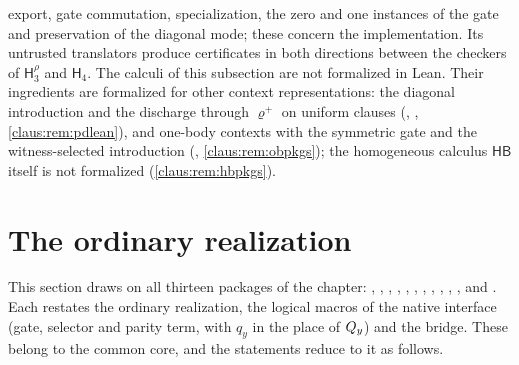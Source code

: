 \begin{remark}
export, gate commutation, specialization, the zero and one instances of
the gate and preservation of the diagonal mode; these concern the
implementation. Its untrusted translators produce certificates in both
directions between the checkers of $\mathsf{H}_3^{\rho}$ and
$\mathsf{H}_4$. The calculi of this subsection are not formalized in Lean.
Their ingredients are formalized for other context representations: the
diagonal introduction and the discharge through $\varrho^{+}$ on uniform
clauses (, , \cref{claus:rem:pdlean}), and one-body
contexts with the symmetric gate and the witness-selected introduction
(, \cref{claus:rem:obpkgs}); the homogeneous calculus
$\mathsf{HB}$ itself is not formalized (\cref{claus:rem:hbpkgs}).
\end{remark}

\section{The ordinary realization}
\label{claus:sec:real}

This section draws on all thirteen packages of the chapter:
, ,
, ,
, ,
, , ,
, ,
 and . Each restates the
ordinary realization, the logical macros of the native interface (gate,
selector and parity term, with $q_y$ in the place of $Q_{y}$) and the
bridge. These belong to the common core, and the statements reduce to it
as follows.

